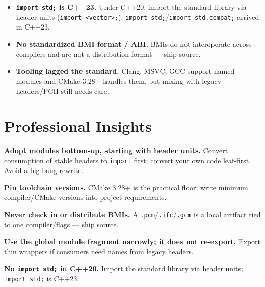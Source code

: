 \begin{itemize}
\item \textbf{\texttt{import std;} is C++23.} Under C++20, import the standard library via header units (\texttt{import <vector>;}); \texttt{import std;}/\texttt{import std.compat;} arrived in C++23.
\item \textbf{No standardized BMI format / ABI.} BMIs do not interoperate across compilers and are not a distribution format --- ship source.
\item \textbf{Tooling lagged the standard.} Clang, MSVC, GCC support named modules and CMake 3.28+ handles them, but mixing with legacy headers/PCH still needs care.
\end{itemize}

\section{Professional Insights}
\label{sec:c20-modules-insights}

\textbf{Adopt modules bottom-up, starting with header units.} Convert consumption of stable headers to \texttt{import} first; convert your own code leaf-first. Avoid a big-bang rewrite.

\textbf{Pin toolchain versions.} CMake 3.28+ is the practical floor; write minimum compiler/CMake versions into project requirements.

\textbf{Never check in or distribute BMIs.} A \texttt{.pcm}/\texttt{.ifc}/\texttt{.gcm} is a local artifact tied to one compiler/flags --- ship source.

\textbf{Use the global module fragment narrowly; it does not re-export.} Export thin wrappers if consumers need names from legacy headers.

\textbf{No \texttt{import std;} in C++20.} Import the standard library via header units; \texttt{import std;} is C++23.

